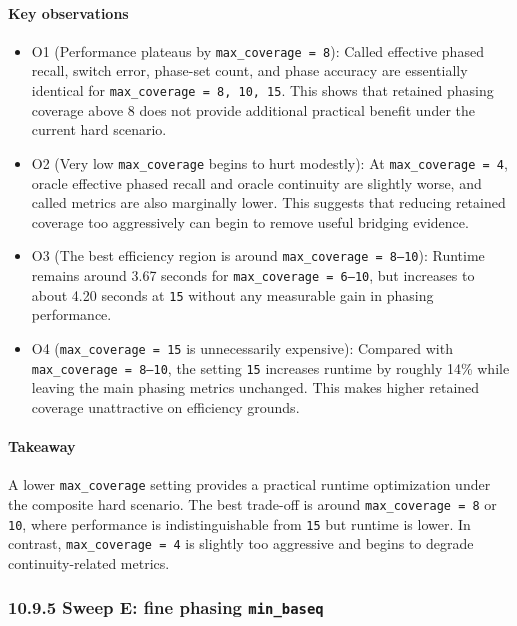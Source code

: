 \documentclass[
]{article}
\begin{document}
\paragraph{Key observations}\label{key-observations-10}

\begin{itemize}
\item
  O1 (Performance plateaus by \texttt{max\_coverage\ =\ 8}): Called
  effective phased recall, switch error, phase-set count, and phase
  accuracy are essentially identical for
  \texttt{max\_coverage\ =\ 8,\ 10,\ 15}. This shows that retained
  phasing coverage above 8 does not provide additional practical benefit
  under the current hard scenario.
\item
  O2 (Very low \texttt{max\_coverage} begins to hurt modestly): At
  \texttt{max\_coverage\ =\ 4}, oracle effective phased recall and
  oracle continuity are slightly worse, and called metrics are also
  marginally lower. This suggests that reducing retained coverage too
  aggressively can begin to remove useful bridging evidence.
\item
  O3 (The best efficiency region is around
  \texttt{max\_coverage\ =\ 8–10}): Runtime remains around 3.67 seconds
  for \texttt{max\_coverage\ =\ 6–10}, but increases to about 4.20
  seconds at \texttt{15} without any measurable gain in phasing
  performance.
\item
  O4 (\texttt{max\_coverage\ =\ 15} is unnecessarily expensive):
  Compared with \texttt{max\_coverage\ =\ 8–10}, the setting \texttt{15}
  increases runtime by roughly 14\% while leaving the main phasing
  metrics unchanged. This makes higher retained coverage unattractive on
  efficiency grounds.
\end{itemize}

\paragraph{Takeaway}\label{takeaway-10}

A lower \texttt{max\_coverage} setting provides a practical runtime
optimization under the composite hard scenario. The best trade-off is
around \texttt{max\_coverage\ =\ 8} or \texttt{10}, where performance is
indistinguishable from \texttt{15} but runtime is lower. In contrast,
\texttt{max\_coverage\ =\ 4} is slightly too aggressive and begins to
degrade continuity-related metrics.

\subsubsection{\texorpdfstring{10.9.5 Sweep E: fine phasing
\texttt{min\_baseq}}{10.9.5 Sweep E: fine phasing min\_baseq}}\label{sweep-e-fine-phasing-min_baseq}
\end{document}
